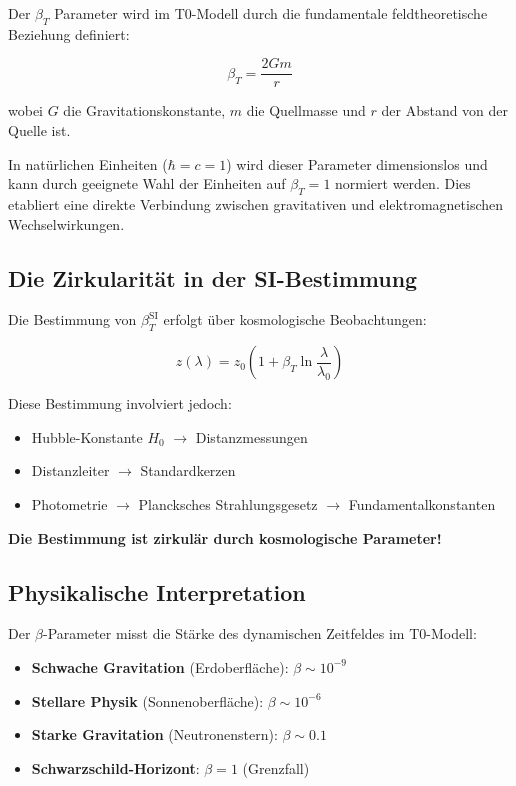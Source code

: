 \documentclass[12pt,a4paper]{article}
\begin{document}
Der $\beta_T$ Parameter wird im T0-Modell durch die fundamentale feldtheoretische Beziehung definiert:

\begin{equation}
	\beta_T = \frac{2Gm}{r}
	\label{eq:beta_definition}
\end{equation}

wobei $G$ die Gravitationskonstante, $m$ die Quellmasse und $r$ der Abstand von der Quelle ist.

In natürlichen Einheiten ($\hbar = c = 1$) wird dieser Parameter dimensionslos und kann durch geeignete Wahl der Einheiten auf $\beta_T = 1$ normiert werden. Dies etabliert eine direkte Verbindung zwischen gravitativen und elektromagnetischen Wechselwirkungen.

\subsection{Die Zirkularität in der SI-Bestimmung}
\label{subsec:beta_circularity}

Die Bestimmung von $\beta_T^{\text{SI}}$ erfolgt über kosmologische Beobachtungen:

\begin{equation}
	z(\lambda) = z_0\left(1 + \beta_T \ln\frac{\lambda}{\lambda_0}\right)
\end{equation}

Diese Bestimmung involviert jedoch:
\begin{itemize}
	\item Hubble-Konstante $H_0$ $\rightarrow$ Distanzmessungen
	\item Distanzleiter $\rightarrow$ Standardkerzen
	\item Photometrie $\rightarrow$ Plancksches Strahlungsgesetz $\rightarrow$ Fundamentalkonstanten
\end{itemize}

\textbf{Die Bestimmung ist zirkulär durch kosmologische Parameter!}

\subsection{Physikalische Interpretation}
\label{subsec:beta_physical}

Der $\beta$-Parameter misst die Stärke des dynamischen Zeitfeldes im T0-Modell:

\begin{itemize}
	\item \textbf{Schwache Gravitation} (Erdoberfläche): $\beta \sim 10^{-9}$
	\item \textbf{Stellare Physik} (Sonnenoberfläche): $\beta \sim 10^{-6}$
	\item \textbf{Starke Gravitation} (Neutronenstern): $\beta \sim 0.1$
	\item \textbf{Schwarzschild-Horizont}: $\beta = 1$ (Grenzfall)
\end{itemize}
\end{document}
